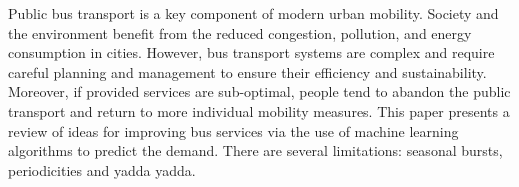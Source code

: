 Public bus transport is a key component of modern urban mobility. Society and the environment
benefit from the reduced congestion, pollution, and energy consumption in cities. However,
bus transport systems are complex and require careful planning and management to
ensure their efficiency and sustainability. Moreover, if provided services are sub-optimal,
people tend to abandon the public transport and return to more individual mobility measures.
This paper presents a review of ideas for improving bus services
 via the use of machine learning algorithms to predict the demand.
There are several limitations: seasonal bursts, periodicities and yadda yadda.
